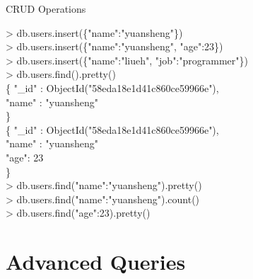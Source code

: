 \documentclass{beamer}
\begin{document}
\begin{frame}{CRUD Operations}
    \begin{minipage}[t]{0.45\textwidth}
        \scriptsize
        \begin{Alms*}
            > db.users.insert(\{"name":"yuansheng"\}) \\
            > db.users.insert(\{"name":"yuansheng", "age":23\}) \\
            > db.users.insert(\{"name":"liueh", "job":"programmer"\}) \\
            > db.users.find().pretty() \\
            \{ \NI
                "\_id" : ObjectId("58eda18e1d41c860ce59966e"), \\
                "name" : "yuansheng" \\
            \ND \} \\
            \{ \NI
                "\_id" : ObjectId("58eda18e1d41c860ce59966e"), \\
                "name" : "yuansheng" \\
                "age": 23 \\
            \ND \} \\
            > db.users.find({"name":"yuansheng"}).pretty() \\
            > db.users.find({"name":"yuansheng"}).count() \\
            > db.users.find({"age":23}).pretty() \\
        \end{Alms*}
    \end{minipage}
\end{frame}


\section{Advanced Queries}
\begin{frame}
    
\end{frame}
\end{document}
